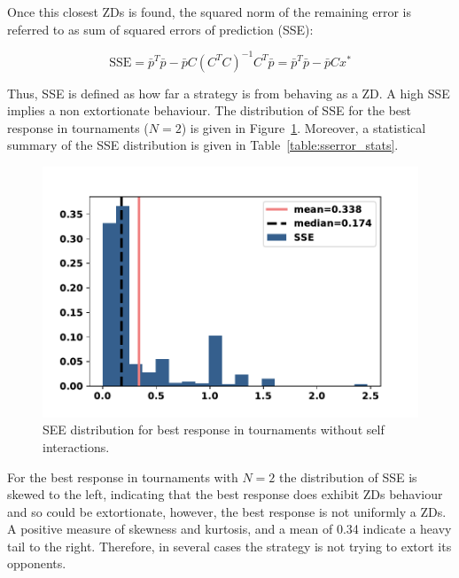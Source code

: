 \documentclass[10pt]{article}
\begin{document}
Once this closest ZDs is found, the squared norm of the remaining error is referred to as sum of squared errors
of prediction (SSE):

\begin{equation}\label{eqn:x_SSError_formula}
    \text{SSE} = {\bar{p}} ^ T \bar{p} -
           \bar{p} C \left(C ^ T C \right) ^ {-1} C ^ T \bar{p}
         = {\bar{p}} ^ T \bar{p} - \bar{p} C x ^ *
\end{equation}

Thus, SSE is defined as how far a strategy is from behaving as a ZD. A
high SSE implies a non extortionate behaviour.
The distribution of SSE for the best response in tournaments
(\(N=2\)) is given in
Figure~\ref{fig:sse_distributions}. Moreover, a statistical summary of the SSE
distribution is given in Table~\ref{table:sserror_stats}.

\begin{table}[!htbp]
    \begin{center}
    \end{center}
    \caption{SSE of best response memory-one when \(N=2\)}\label{table:sserror_stats}
\end{table}

\begin{figure}[!htbp]
    \begin{center}
        \includegraphics[width=.5\linewidth]{img/best_respones_sserror.pdf}
    \end{center}
    \caption{SEE distribution for best response in tournaments without self interactions.}\label{fig:sse_distributions}
\end{figure}

For the best response in tournaments with \(N=2\) the
distribution of SSE is skewed to the left, indicating that the best response
does exhibit ZDs behaviour and so could be extortionate, however, the best
response is not uniformly a ZDs. A positive measure of skewness and kurtosis,
and a mean of 0.34 indicate a heavy tail to the right. Therefore, in several
cases the strategy is not trying to extort its opponents. 
\end{document}
